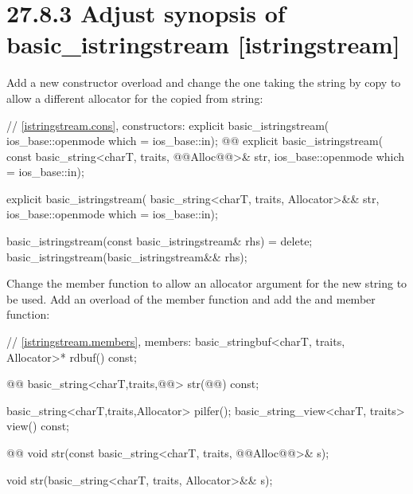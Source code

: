 \documentclass[ebook,11pt,article]{memoir}
\begin{document}
\section{27.8.3 Adjust synopsis of basic\_istringstream [istringstream]}
Add a new constructor overload and change the one taking the string by copy to allow a different allocator for the copied from string:
\begin{codeblock}
    // \ref{istringstream.cons}, constructors:
    explicit basic_istringstream(
      ios_base::openmode which = ios_base::in);
    @@
    explicit basic_istringstream(
      const basic_string<charT, traits, @@Alloc@@>& str,
      ios_base::openmode which = ios_base::in);
\end{codeblock}
\begin{addedblock}
\begin{codeblock}
    explicit basic_istringstream(
      basic_string<charT, traits, Allocator>&& str,
      ios_base::openmode which = ios_base::in);
\end{codeblock}
\end{addedblock}
\begin{codeblock}
    basic_istringstream(const basic_istringstream& rhs) = delete;
    basic_istringstream(basic_istringstream&& rhs);
\end{codeblock}

Change the  member function to allow an allocator argument for the new string to be used.
Add an overload of the  member function and add the  and  member function:

\begin{codeblock}
    // \ref{istringstream.members}, members:
    basic_stringbuf<charT, traits, Allocator>* rdbuf() const;

    @@
    basic_string<charT,traits,@@> str(@@) const;
\end{codeblock}
\begin{addedblock}\begin{codeblock}
    basic_string<charT,traits,Allocator> pilfer();
    basic_string_view<charT, traits> view() const;
\end{codeblock}\end{addedblock}
\begin{codeblock}
    @@
    void str(const basic_string<charT, traits, @@Alloc@@>& s);
\end{codeblock}
\begin{addedblock}
\begin{codeblock}
    void str(basic_string<charT, traits, Allocator>&& s);
\end{codeblock}
\end{addedblock}
\end{document}
